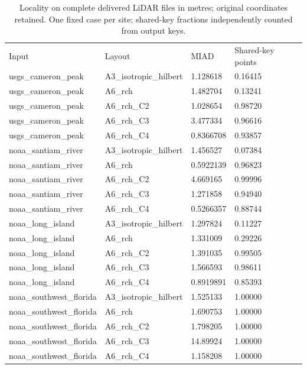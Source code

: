 \begin{table}[tbp]\centering\scriptsize
\caption{Locality on complete delivered LiDAR files in metres; original coordinates retained. One fixed case per site; shared-key fractions independently counted from output keys.}
\begin{tabular}{llll}
\hline
Input & Layout & MIAD & Shared-key points \\
usgs\_cameron\_peak & A3\_isotropic\_hilbert & 1.128618 & 0.16415 \\
usgs\_cameron\_peak & A6\_rch & 1.482704 & 0.13241 \\
usgs\_cameron\_peak & A6\_rch\_C2 & 1.028654 & 0.98720 \\
usgs\_cameron\_peak & A6\_rch\_C3 & 3.477334 & 0.96616 \\
usgs\_cameron\_peak & A6\_rch\_C4 & 0.8366708 & 0.93857 \\
noaa\_santiam\_river & A3\_isotropic\_hilbert & 1.456527 & 0.07384 \\
noaa\_santiam\_river & A6\_rch & 0.5922139 & 0.96823 \\
noaa\_santiam\_river & A6\_rch\_C2 & 4.669165 & 0.99996 \\
noaa\_santiam\_river & A6\_rch\_C3 & 1.271858 & 0.94940 \\
noaa\_santiam\_river & A6\_rch\_C4 & 0.5266357 & 0.88744 \\
noaa\_long\_island & A3\_isotropic\_hilbert & 1.297824 & 0.11227 \\
noaa\_long\_island & A6\_rch & 1.331009 & 0.29226 \\
noaa\_long\_island & A6\_rch\_C2 & 1.391035 & 0.99505 \\
noaa\_long\_island & A6\_rch\_C3 & 1.566593 & 0.98611 \\
noaa\_long\_island & A6\_rch\_C4 & 0.8919891 & 0.85393 \\
noaa\_southwest\_florida & A3\_isotropic\_hilbert & 1.525133 & 1.00000 \\
noaa\_southwest\_florida & A6\_rch & 1.690753 & 1.00000 \\
noaa\_southwest\_florida & A6\_rch\_C2 & 1.798205 & 1.00000 \\
noaa\_southwest\_florida & A6\_rch\_C3 & 14.89924 & 1.00000 \\
noaa\_southwest\_florida & A6\_rch\_C4 & 1.158208 & 1.00000 \\
\hline
\end{tabular}
\end{table}
